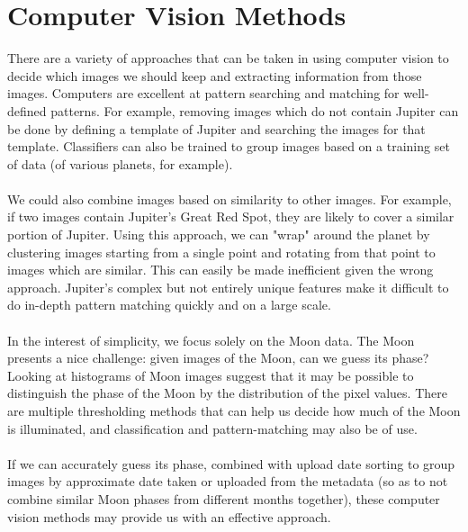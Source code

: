 \documentclass[]{article}
\begin{document}
\section*{Computer Vision Methods}
There are a variety of approaches that can be taken in using computer vision to decide which images we should keep and extracting information from those images. Computers are excellent at pattern searching and matching for well-defined patterns. For example, removing images which do not contain Jupiter can be done by defining a template of Jupiter and searching the images for that template. Classifiers can also be trained to group images based on a training set of data (of various planets, for example). 
\\\\
We could also combine images based on similarity to other images. For example, if two images contain Jupiter's Great Red Spot, they are likely to cover a similar portion of Jupiter. Using this approach, we can "wrap" around the planet by clustering images starting from a single point and rotating from that point to images which are similar. This can easily be made inefficient given the wrong approach. Jupiter's complex but not entirely unique features make it difficult to do in-depth pattern matching quickly and on a large scale.
\\\\
In the interest of simplicity, we focus solely on the Moon data. The Moon presents a nice challenge: given images of the Moon, can we guess its phase? Looking at histograms of Moon images suggest that it may be possible to distinguish the phase of the Moon by the distribution of the pixel values. There are multiple thresholding methods that can help us decide how much of the Moon is illuminated, and classification and pattern-matching may also be of use.
\\\\
If we can accurately guess its phase, combined with upload date sorting to group images by approximate date taken or uploaded from the metadata (so as to not combine similar Moon phases from different months together), these computer vision methods may provide us with an effective approach.
\end{document}
